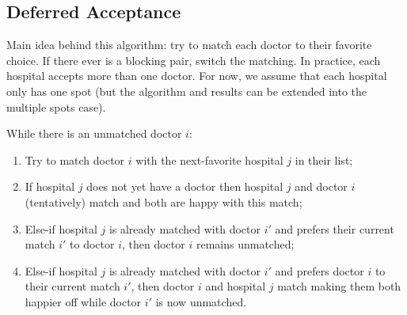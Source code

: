 \documentclass[dvipsnames]{article}
\theoremstyle{definition}
\theoremstyle{remark}
\newenvironment{mech}[1]{\begin{tcolorbox}[colback=red!5!white,colframe=red!75!black,title={#1}]}{\end{tcolorbox}}
\begin{document}
\subsection{Deferred Acceptance}
Main idea behind this algorithm: try to match each doctor to their favorite choice. If there ever is a blocking pair, switch the matching. In practice, each hospital accepts more than one doctor. For now, we assume that each hospital only has one spot (but the algorithm and results can be extended into the multiple spots case).

\begin{mech}{Deferred Acceptance}
	While there is an unmatched doctor $i$:
	\begin{enumerate}
		\item Try to match doctor $i$ with the next-favorite hospital $j$ in their list;
		\item If hospital $j$ does not yet have a doctor then hospital $j$ and doctor $i$ (tentatively) match and both are happy with this match;
		\item Else-if hospital $j$ is already matched with doctor $i'$ and prefers their current match $i'$ to doctor $i$, then doctor $i$ remains unmatched;
		\item Else-if hospital $j$ is already matched with doctor $i'$ and prefers doctor $i$ to their current match $i'$, then doctor $i$ and hospital $j$ match making them both happier off while doctor $i'$ is now unmatched.
	\end{enumerate}
\end{mech}
\end{document}
